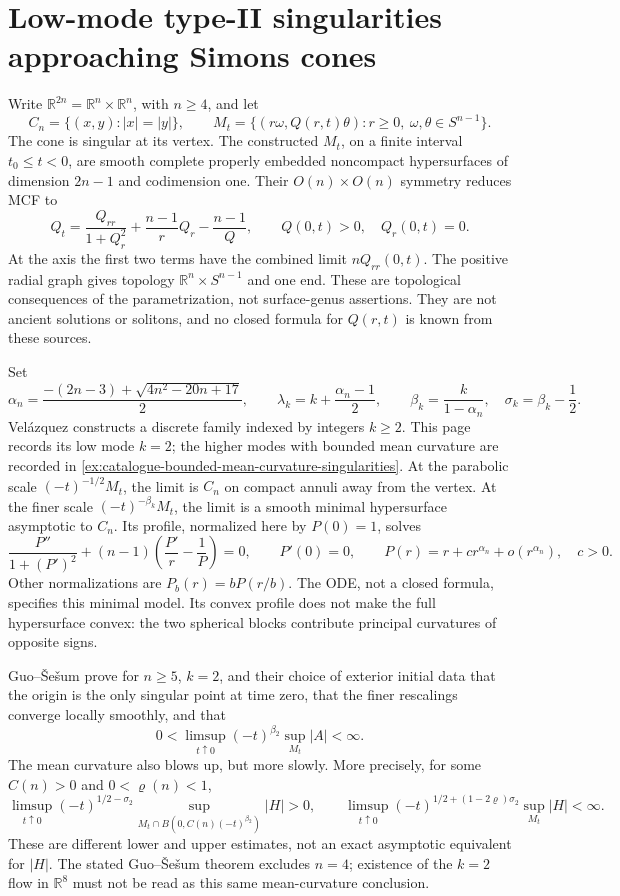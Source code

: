 \chapter{Low-mode type-II singularities approaching Simons cones}\label{sec:catalogue-simons-cone-low-mode}
\begin{example}\label{ex:catalogue-simons-cone-low-mode}
Write $\mathbb R^{2n}=\mathbb R^n\times\mathbb R^n$, with $n\geq4$, and let
\[
 C_n=\{(x,y):|x|=|y|\},\qquad
 M_t=\{(r\omega,Q(r,t)\theta):r\geq0,\ \omega,\theta\in S^{n-1}\}.
\]
The cone is singular at its vertex. The constructed $M_t$, on a finite interval $t_0\leq t<0$, are smooth complete properly embedded noncompact hypersurfaces of dimension $2n-1$ and codimension one. Their $O(n)\times O(n)$ symmetry reduces MCF to
\[
 Q_t=\frac{Q_{rr}}{1+Q_r^2}+\frac{n-1}{r}Q_r-\frac{n-1}{Q},
 \qquad Q(0,t)>0,\quad Q_r(0,t)=0.
\]
At the axis the first two terms have the combined limit $nQ_{rr}(0,t)$. The positive radial graph gives topology $\mathbb R^n\times S^{n-1}$ and one end. These are topological consequences of the parametrization, not surface-genus assertions. They are not ancient solutions or solitons, and no closed formula for $Q(r,t)$ is known from these sources.

Set
\[
 \alpha_n=\frac{-(2n-3)+\sqrt{4n^2-20n+17}}2,
 \qquad \lambda_k=k+\frac{\alpha_n-1}{2},
 \qquad \beta_k=\frac{k}{1-\alpha_n},\quad \sigma_k=\beta_k-\frac12.
\]
Vel\'azquez constructs a discrete family indexed by integers $k\geq2$. This page records its low mode $k=2$; the higher modes with bounded mean curvature are recorded in \ref{ex:catalogue-bounded-mean-curvature-singularities}. At the parabolic scale $(-t)^{-1/2}M_t$, the limit is $C_n$ on compact annuli away from the vertex. At the finer scale $(-t)^{-\beta_k}M_t$, the limit is a smooth minimal hypersurface asymptotic to $C_n$. Its profile, normalized here by $P(0)=1$, solves
\[
 \frac{P''}{1+(P')^2}+(n-1)\left(\frac{P'}r-\frac1P\right)=0,
 \qquad P'(0)=0,\qquad P(r)=r+c r^{\alpha_n}+o(r^{\alpha_n}),\quad c>0.
\]
Other normalizations are $P_b(r)=bP(r/b)$. The ODE, not a closed formula, specifies this minimal model. Its convex profile does not make the full hypersurface convex: the two spherical blocks contribute principal curvatures of opposite signs.

Guo--\v Se\v sum prove for $n\geq5$, $k=2$, and their choice of exterior initial data that the origin is the only singular point at time zero, that the finer rescalings converge locally smoothly, and that
\[
 0<\limsup_{t\uparrow0}(-t)^{\beta_2}\sup_{M_t}|A|<\infty.
\]
The mean curvature also blows up, but more slowly. More precisely, for some $C(n)>0$ and $0<\varrho(n)<1$,
\[
 \limsup_{t\uparrow0}(-t)^{1/2-\sigma_2}
 \sup_{M_t\cap B(0,C(n)(-t)^{\beta_2})}|H|>0,
 \qquad
 \limsup_{t\uparrow0}(-t)^{1/2+(1-2\varrho)\sigma_2}\sup_{M_t}|H|<\infty.
\]
These are different lower and upper estimates, not an exact asymptotic equivalent for $|H|$. The stated Guo--\v Se\v sum theorem excludes $n=4$; existence of the $k=2$ flow in $\mathbb R^8$ must not be read as this same mean-curvature conclusion.


\end{example}
